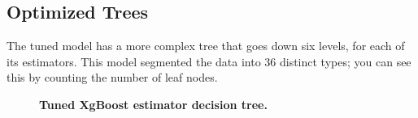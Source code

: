 \subsection*{Optimized Trees}
The tuned model has a more complex tree that goes down six levels, for each of its estimators. This model segmented the data into 36 distinct types; you can see this by counting the number of leaf nodes.
\begin{figure}[!hbtp]
\centering

    \qquad


    \caption{\textbf{Tuned XgBoost estimator decision tree.}}
\end{figure}




